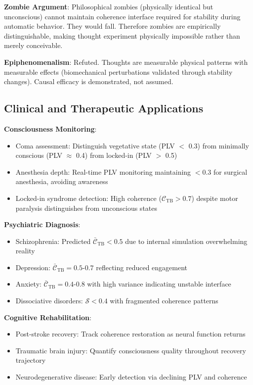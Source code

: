 \documentclass[11pt,onecolumn]{article}
\begin{document}
\textbf{Zombie Argument}: Philosophical zombies (physically identical but unconscious) cannot maintain coherence interface required for stability during automatic behavior. They would fall. Therefore zombies are empirically distinguishable, making thought experiment physically impossible rather than merely conceivable.

\textbf{Epiphenomenalism}: Refuted. Thoughts are measurable physical patterns with measurable effects (biomechanical perturbations validated through stability changes). Causal efficacy is demonstrated, not assumed.

\subsection{Clinical and Therapeutic Applications}

\textbf{Consciousness Monitoring}:
\begin{itemize}
\item Coma assessment: Distinguish vegetative state (PLV $<$ 0.3) from minimally conscious (PLV $\approx$ 0.4) from locked-in (PLV $>$ 0.5)
\item Anesthesia depth: Real-time PLV monitoring maintaining $<$0.3 for surgical anesthesia, avoiding awareness
\item Locked-in syndrome detection: High coherence ($\mathcal{C}_{\text{TB}} > 0.7$) despite motor paralysis distinguishes from unconscious states
\end{itemize}

\textbf{Psychiatric Diagnosis}:
\begin{itemize}
\item Schizophrenia: Predicted $\bar{\mathcal{C}}_{\text{TB}} < 0.5$ due to internal simulation overwhelming reality
\item Depression: $\bar{\mathcal{C}}_{\text{TB}} = 0.5$-$0.7$ reflecting reduced engagement
\item Anxiety: $\bar{\mathcal{C}}_{\text{TB}} = 0.4$-$0.8$ with high variance indicating unstable interface
\item Dissociative disorders: $\mathcal{S} < 0.4$ with fragmented coherence patterns
\end{itemize}

\textbf{Cognitive Rehabilitation}:
\begin{itemize}
\item Post-stroke recovery: Track coherence restoration as neural function returns
\item Traumatic brain injury: Quantify consciousness quality throughout recovery trajectory
\item Neurodegenerative disease: Early detection via declining PLV and coherence
\end{itemize}
\end{document}
